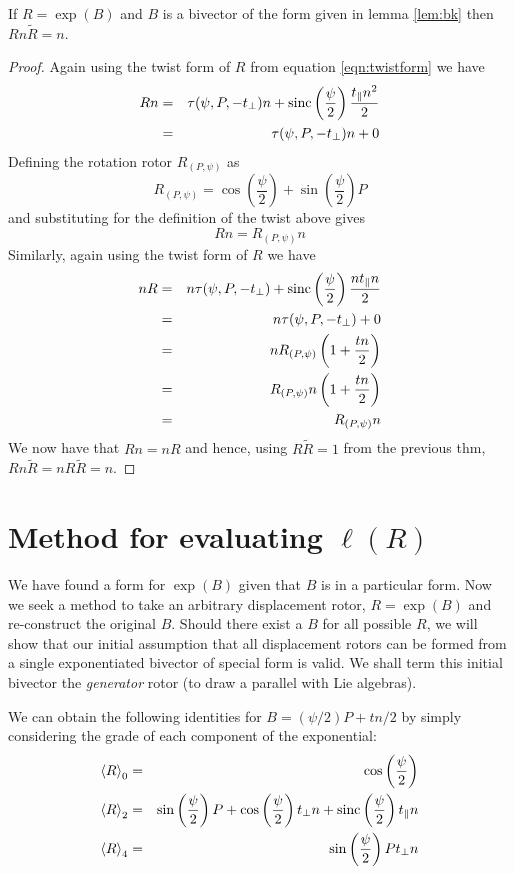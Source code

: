 \begin{thm} If $R = \exp(B)$ and $B$ is a bivector of the form 
given in lemma
\ref{lem:bk} then $Rn\tilde{R} = n$.
\end{thm}
\begin{proof}
Again using the twist form of $R$ from equation \ref{eqn:twistform} we have
\begin{eqnarray*}
Rn & = & \tau(\psi, P, - t_\perp)n + 
\mathrm{sinc}\left(\frac{\psi}{2}\right)\frac{t_\parallel n^2}{2} \\
&=& \tau(\psi, P, - t_\perp)n + 0
\end{eqnarray*}
Defining the rotation rotor $R_{(P,\psi)}$ as
\[
R_{(P,\psi)} = \cos\left(\frac{\psi}{2}\right) +
   \sin\left(\frac{\psi}{2}\right)P
\]
and substituting for the definition of the twist above gives
\[
Rn = R_{(P,\psi)} n
\]
Similarly, again using the twist form of $R$ we have
\begin{eqnarray*}
nR & = & n\tau(\psi, P, - t_\perp) + 
\mathrm{sinc}\left(\frac{\psi}{2}\right)\frac{nt_\parallel n}{2} \\
&=& n\tau(\psi, P, - t_\perp) + 0 \\
&=& n R_{(P,\psi)} \left( 1 + \frac{tn}{2} \right) \\
&=& R_{(P,\psi)} n \left( 1 + \frac{tn}{2} \right) \\
&=& R_{(P,\psi)} n 
\end{eqnarray*}
We now have that $Rn = nR$ and hence, using
$R\tilde{R} = 1$ from the previous thm, 
$Rn\tilde{R} = nR\tilde{R} = n$.
\end{proof}

\section{Method for evaluating $\ell(R)$}

We have found a form for $\exp(B)$ given that $B$ is in a particular form.
Now we seek a method to take an arbitrary displacement
rotor, $R = \exp(B)$ and re-construct the original $B$. Should there exist
a $B$ for all possible $R$, we will show that our initial assumption
that all displacement rotors can be formed from a single exponentiated bivector
of special form is valid. We shall term this initial bivector
the \emph{generator} rotor (to draw a parallel with Lie algebras).

We can obtain the following identities for $B=(\psi / 2) P + tn / 2$ by simply considering
the grade of each component of the exponential:
\begin{eqnarray*}
\left< R \right>_0 & = & \cos\left(\frac{\psi}{2}\right) \\
\left< R \right>_2 & = & \sin\left(\frac{\psi}{2}\right) P + 
  \cos\left(\frac{\psi}{2}\right) t_\perp n + \mathrm{sinc}\left(\frac{\psi}{2}\right) t_\parallel n \\
\left< R \right>_4 & = & \sin\left(\frac{\psi}{2}\right) Pt_\perp n
\end{eqnarray*}

